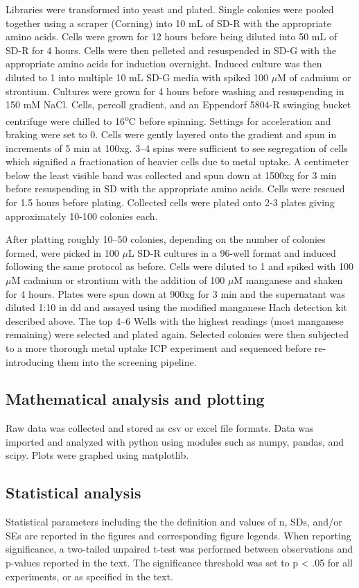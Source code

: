 \documentclass[../main/main]{subfiles}
\begin{document}
Libraries were transformed into yeast and plated. Single colonies were pooled together using a scraper (Corning) into 10 mL of SD-R with the appropriate amino acids. Cells were grown for 12 hours before being diluted into 50 mL of SD-R for 4 hours. Cells were then pelleted and resuspended in SD-G with the appropriate amino acids for induction overnight. Induced culture was then diluted to 1 \OD{} into multiple 10 mL SD-G media with spiked 100 $\mu$M of cadmium or strontium. Cultures were grown for 4 hours before washing and resuspending in 150 mM NaCl. Cells, percoll gradient, and an Eppendorf 5804-R swinging bucket centrifuge were chilled to 16\textsuperscript{o}C before spinning. Settings for acceleration and braking were set to 0. Cells were gently layered onto the gradient and spun in increments of 5 min at 100xg. 3--4 spins were sufficient to see segregation of cells which signified a fractionation of heavier cells due to metal uptake. A centimeter below the least visible band was collected and spun down at 1500xg for 3 min before resuspending in SD with the appropriate amino acids. Cells were rescued for 1.5 hours before plating. Collected cells were plated onto 2-3 plates giving approximately 10-100 colonies each.

After platting roughly 10--50 colonies, depending on the number of colonies formed, were picked in 100 $\mu$L SD-R cultures in a 96-well format and induced following the same protocol as before. Cells were diluted to 1 \OD and spiked with 100 $\mu$M cadmium or strontium with the addition of 100 $\mu$M manganese and shaken for 4 hours. Plates were spun down at 900xg for 3 min and the supernatant was diluted 1:10 in dd and assayed using the modified manganese Hach detection kit described above. The top 4--6 Wells with the highest readings (most manganese remaining) were selected and plated again. Selected colonies were then subjected to a more thorough metal uptake ICP experiment and sequenced before re-introducing them into the screening pipeline.

\subsection*{Mathematical analysis and plotting}
Raw data was collected and stored as csv or excel file formats. Data was imported and analyzed with python using modules such as numpy, pandas, and scipy. Plots were graphed using matplotlib.

\subsection*{Statistical analysis}
Statistical parameters including the the definition and values of n, SDs, and/or SEs are reported in the figures and corresponding figure legends. When reporting significance, a two-tailed unpaired t-test was performed between observations and p-values reported in the text. The significance threshold was set to p < .05 for all experiments, or as specified in the text.
\end{document}

